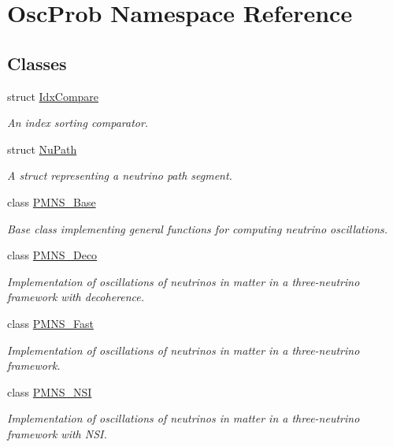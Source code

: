 \hypertarget{namespaceOscProb}{}\section{Osc\+Prob Namespace Reference}
\label{namespaceOscProb}
\subsection*{Classes}
\begin{DoxyCompactItemize}
\item 
struct \hyperlink{structOscProb_1_1IdxCompare}{Idx\+Compare}
\begin{DoxyCompactList}\small\item\em An index sorting comparator. \end{DoxyCompactList}\item 
struct \hyperlink{structOscProb_1_1NuPath}{Nu\+Path}
\begin{DoxyCompactList}\small\item\em A struct representing a neutrino path segment. \end{DoxyCompactList}\item 
class \hyperlink{classOscProb_1_1PMNS__Base}{P\+M\+N\+S\+\_\+\+Base}
\begin{DoxyCompactList}\small\item\em Base class implementing general functions for computing neutrino oscillations. \end{DoxyCompactList}\item 
class \hyperlink{classOscProb_1_1PMNS__Deco}{P\+M\+N\+S\+\_\+\+Deco}
\begin{DoxyCompactList}\small\item\em Implementation of oscillations of neutrinos in matter in a three-\/neutrino framework with decoherence. \end{DoxyCompactList}\item 
class \hyperlink{classOscProb_1_1PMNS__Fast}{P\+M\+N\+S\+\_\+\+Fast}
\begin{DoxyCompactList}\small\item\em Implementation of oscillations of neutrinos in matter in a three-\/neutrino framework. \end{DoxyCompactList}\item 
class \hyperlink{classOscProb_1_1PMNS__NSI}{P\+M\+N\+S\+\_\+\+N\+SI}
\begin{DoxyCompactList}\small\item\em Implementation of oscillations of neutrinos in matter in a three-\/neutrino framework with N\+SI. \end{DoxyCompactList}\item 

\end{DoxyCompactItemize}
